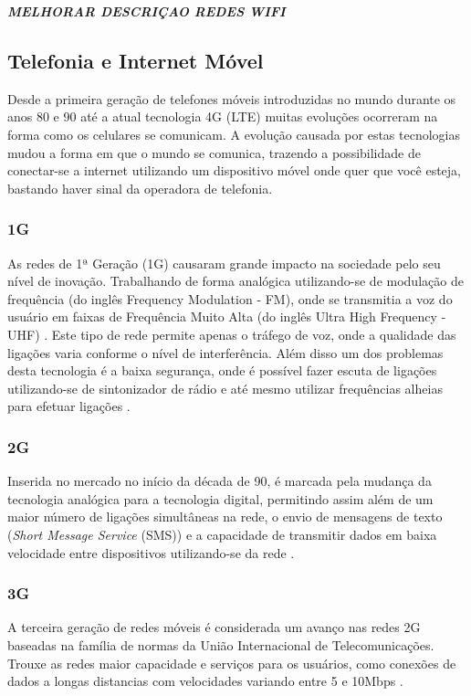 \emph{\bf{MELHORAR DESCRIÇAO REDES WIFI}}

\subsection{Telefonia e Internet Móvel}
Desde a primeira geração de telefones móveis introduzidas no mundo durante os anos 80 e 90  até a atual tecnologia 4G (LTE) muitas evoluções ocorreram na forma como os celulares se comunicam. A evolução causada por estas tecnologias mudou a forma em que o mundo se comunica, trazendo a possibilidade de conectar-se a internet utilizando um dispositivo móvel onde quer que você esteja, bastando haver sinal da operadora de telefonia.

\subsubsection{1G}
As redes de 1ª Geração (1G) causaram grande impacto na sociedade pelo seu nível de inovação. Trabalhando de forma analógica utilizando-se de modulação de frequência (do inglês Frequency Modulation - FM), onde se transmitia a voz do usuário em faixas de Frequência Muito Alta (do inglês Ultra High Frequency - UHF) \cite{AEvolucaoTelefoniaCelular}. Este tipo de rede permite apenas o tráfego de voz, onde a qualidade das ligações varia conforme o nível de interferência. Além disso um dos problemas desta tecnologia é a baixa segurança, onde é possível fazer escuta de ligações utilizando-se de sintonizador de rádio e até mesmo utilizar frequências alheias para efetuar ligações  \cite{GeracoesTelefoniaMovel}.

\subsubsection{2G}
Inserida no mercado no início da década de 90, é marcada pela mudança da tecnologia analógica para a tecnologia digital, permitindo assim além de um maior número de ligações simultâneas na rede, o envio de mensagens de texto (\emph{Short Message Service} (SMS)) e a capacidade de transmitir dados em baixa velocidade entre dispositivos utilizando-se da rede \cite{GeracoesTelefoniaMovel}.

\subsubsection{3G}
A terceira geração de redes móveis é considerada um avanço nas redes 2G baseadas na família de normas da União Internacional de Telecomunicações. Trouxe as redes maior capacidade e serviços para os usuários, como conexões de dados a longas distancias com velocidades variando entre 5 e 10Mbps \cite{GeracoesTelefoniaMovel}.

